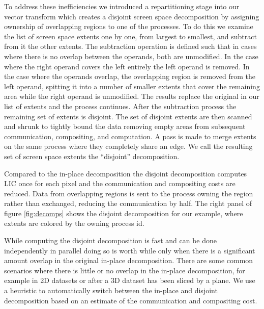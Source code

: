 \documentclass[a4paper,10pt]{article}
\begin{document}
To address these inefficiencies we introduced a repartitioning stage into our vector transform which creates a disjoint screen space decomposition by assigning ownership of overlapping regions to one of the processes. To do this we examine the list of screen space extents one by one, from largest to smallest, and subtract from it the other extents. The subtraction operation is defined such that in cases where there is no overlap between the operands, both are unmodified. In the case where the right operand covers the left entirely the left operand is removed. In the case where the operands overlap, the overlapping region is removed from the left operand, spitting it into a number of smaller extents that cover the remaining area while the right operand is unmodified. The results replace the original in our list of extents and the process continues. After the subtraction process the remaining set of extents is disjoint. The set of disjoint extents are then scanned and shrunk to tightly bound the data removing empty areas from subsequent communication, compositing, and computation. A pass is made to merge extents on the same process where they completely share an edge. We call the resulting set of screen space extents the ``disjoint'' decomposition. 

Compared to the in-place decomposition the disjoint decomposition computes LIC once for each pixel and the communication and compositing costs are reduced. Data from overlapping regions is sent to the process owning the region rather than exchanged, reducing the communication by half. The right panel of figure \ref{fig:decomps} shows the disjoint decomposition for our example, where extents are colored by the owning process id.

While computing the disjoint decomposition is fast and can be done independently in parallel doing so is worth while only when there is a significant amount overlap in the original in-place decomposition. There are some common scenarios where there is little or no overlap in the in-place decomposition, for example in 2D datasets or after a 3D dataset has been sliced by a plane. We use a heuristic to automatically switch between the in-place and disjoint decomposition based on an estimate of the communication and compositing cost.
\end{document}
